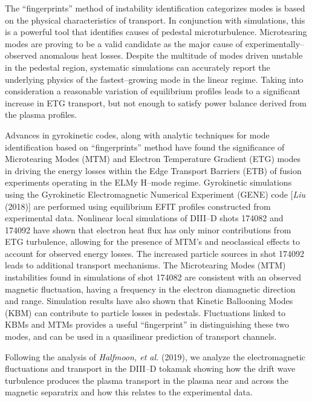 \documentclass[a4paper,openany,12pt]{book}
\begin{document}
The ``fingerprints'' method of instability identification categorizes modes is based on the physical characteristics of transport. In conjunction with simulations, this is a powerful tool that identifies causes of pedestal microturbulence. Microtearing modes are proving to be a valid candidate as the major cause of experimentally--observed anomalous heat losses. Despite the multitude of modes driven unstable in the pedestal region, systematic simulations can accurately report the underlying physics of the fastest--growing mode in the linear regime. Taking into consideration a reasonable variation of equilibrium profiles leads to a significant increase in ETG transport, but not enough to satisfy power balance derived from the plasma profiles.

Advances in gyrokinetic codes, along with analytic techniques for mode identification based on ``fingerprints'' method have found the significance of Microtearing Modes (MTM) and Electron Temperature Gradient (ETG) modes in driving the energy losses within the Edge Transport Barriers (ETB) of fusion experiments operating in the ELMy H--mode regime. Gyrokinetic simulations using the Gyrokinetic Electromagnetic Numerical Experiment (GENE) code [\emph{Liu} (2018)] are performed using equilibrium EFIT profiles constructed from experimental data. Nonlinear local simulations of DIII--D shots 174082 and 174092 have shown that electron heat flux has only minor contributions from ETG turbulence, allowing for the presence of MTM's and neoclassical effects to account for observed energy losses. The increased particle sources in shot 174092 leads to additional transport mechanisms. The Microtearing Modes (MTM) instabilities found in simulations of shot 174082 are consistent with an observed magnetic fluctuation, having a frequency in the electron diamagnetic direction and range. Simulation results have also shown that Kinetic Ballooning Modes (KBM) can contribute to particle losses in pedestals. Fluctuations linked to KBMs and MTMs provides a useful ``fingerprint'' in distinguishing these two modes, and can be used in a quasilinear prediction of transport channels.

Following the analysis of \emph{Halfmoon, et al.} (2019), we analyze the electromagnetic fluctuations and transport in the DIII--D tokamak showing how the drift wave turbulence produces the plasma transport in the plasma near and across the magnetic separatrix and how this relates to the experimental data.
\end{document}
